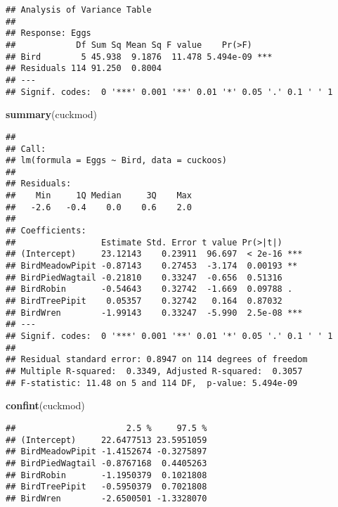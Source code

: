 \documentclass[]{article}
\newenvironment{Shaded}{\begin{snugshade}}{\end{snugshade}}
\newcommand{\KeywordTok}[1]{\textcolor[rgb]{0.13,0.29,0.53}{\textbf{#1}}}
\newcommand{\DataTypeTok}[1]{\textcolor[rgb]{0.13,0.29,0.53}{#1}}
\newcommand{\StringTok}[1]{\textcolor[rgb]{0.31,0.60,0.02}{#1}}
\newcommand{\OperatorTok}[1]{\textcolor[rgb]{0.81,0.36,0.00}{\textbf{#1}}}
\newcommand{\NormalTok}[1]{#1}
\begin{document}
\begin{verbatim}
## Analysis of Variance Table
## 
## Response: Eggs
##            Df Sum Sq Mean Sq F value    Pr(>F)    
## Bird        5 45.938  9.1876  11.478 5.494e-09 ***
## Residuals 114 91.250  0.8004                      
## ---
## Signif. codes:  0 '***' 0.001 '**' 0.01 '*' 0.05 '.' 0.1 ' ' 1
\end{verbatim}

\begin{Shaded}
\begin{Highlighting}[]
\KeywordTok{summary}\NormalTok{(cuckmod)}
\end{Highlighting}
\end{Shaded}

\begin{verbatim}
## 
## Call:
## lm(formula = Eggs ~ Bird, data = cuckoos)
## 
## Residuals:
##    Min     1Q Median     3Q    Max 
##   -2.6   -0.4    0.0    0.6    2.0 
## 
## Coefficients:
##                 Estimate Std. Error t value Pr(>|t|)    
## (Intercept)     23.12143    0.23911  96.697  < 2e-16 ***
## BirdMeadowPipit -0.87143    0.27453  -3.174  0.00193 ** 
## BirdPiedWagtail -0.21810    0.33247  -0.656  0.51316    
## BirdRobin       -0.54643    0.32742  -1.669  0.09788 .  
## BirdTreePipit    0.05357    0.32742   0.164  0.87032    
## BirdWren        -1.99143    0.33247  -5.990  2.5e-08 ***
## ---
## Signif. codes:  0 '***' 0.001 '**' 0.01 '*' 0.05 '.' 0.1 ' ' 1
## 
## Residual standard error: 0.8947 on 114 degrees of freedom
## Multiple R-squared:  0.3349, Adjusted R-squared:  0.3057 
## F-statistic: 11.48 on 5 and 114 DF,  p-value: 5.494e-09
\end{verbatim}

\begin{Shaded}
\begin{Highlighting}[]
\KeywordTok{confint}\NormalTok{(cuckmod)}
\end{Highlighting}
\end{Shaded}

\begin{verbatim}
##                      2.5 %     97.5 %
## (Intercept)     22.6477513 23.5951059
## BirdMeadowPipit -1.4152674 -0.3275897
## BirdPiedWagtail -0.8767168  0.4405263
## BirdRobin       -1.1950379  0.1021808
## BirdTreePipit   -0.5950379  0.7021808
## BirdWren        -2.6500501 -1.3328070
\end{verbatim}

\begin{Shaded}
\end{Shaded}
\end{document}
